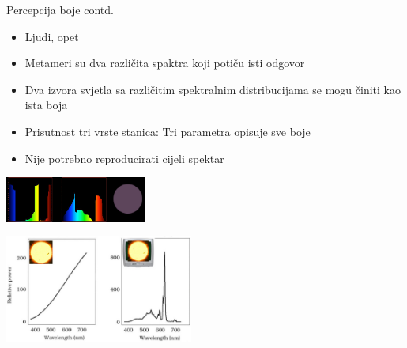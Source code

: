 \documentclass[9pt]{beamer}
\begin{document}
\begin{frame}{Percepcija boje contd.}
	\begin{itemize}
		\item Ljudi, opet
		\item Metameri su dva različita spaktra koji potiču isti odgovor
		\item Dva izvora svjetla sa različitim spektralnim distribucijama se mogu činiti kao ista boja

		\item Prisutnost tri vrste stanica: Tri parametra opisuje sve boje	
		\item Nije potrebno reproducirati cijeli spektar
	\end{itemize}

	\begin{center}
		\includegraphics[height=1.5cm]{slike/02_vidljivi_spektar3.png}
	\end{center}
\begin{center}
	\includegraphics[height=3.5cm]{slike/color_slide_046_cropped.jpg}
\end{center}
\end{frame}
\end{document}
